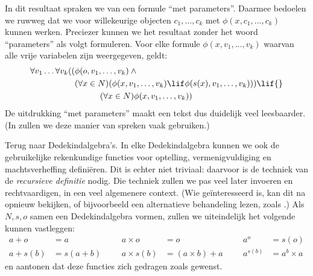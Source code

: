\documentclass[../../../include/open-logic-section]{subfiles}
\begin{document}
In dit resultaat spraken we van een formule ``met parameters''.
Daarmee bedoelen we ruwweg dat we voor willekeurige objecten $c_1,
\ldots, c_k$ met $\phi(x, c_1, \ldots, c_k)$ kunnen werken. Preciezer
kunnen we het resultaat zonder het woord ``parameters'' als volgt
formuleren. Voor elke formule $\phi(x, v_1, \ldots, v_k)$ waarvan alle
vrije variabelen zijn weergegeven, geldt:
	\begin{align*}
			\forall v_1 \ldots \forall v_k((&\phi(o, v_1,\ldots, v_k) \land {}\\
			&	(\forall x \in N)(\phi(x,v_1, \ldots, v_k) \lif \phi(s(x), v_1,\ldots, v_k))) \lif {}\\
			&\hspace{3em} (\forall x \in N)\phi(x, v_1,\ldots, v_k))
	\end{align*}
De uitdrukking ``met parameters'' maakt een tekst dus duidelijk veel
leesbaarder. (In  zullen we deze manier van spreken
vaak gebruiken.)

Terug naar Dedekindalgebra's. In elke Dedekindalgebra kunnen we ook de
gebruikelijke rekenkundige functies voor optelling, vermenigvuldiging
en machtsverheffing definiëren. Dit is echter niet triviaal: daarvoor
is de techniek van de \emph{recursieve definitie} nodig. Die techniek
zullen we pas veel later invoeren en rechtvaardigen, in een veel
algemenere context. (Wie geïnteresseerd is, kan dit na
 opnieuw bekijken, of bijvoorbeeld
een alternatieve behandeling lezen, zoals \citealt[pp.~95--8]{Potter2004}.)
Als $N, s, o$ samen een Dedekindalgebra vormen, zullen we uiteindelijk
het volgende kunnen vastleggen:
\begin{align*}
	{a} + {o} &= {a} & & & {a} \times {o} &= {o} & & & {a}^{o} &= s(o)\\
{a} + {s}({b}) &= {s}({a}+{b}) &&& {a} \times {s}({b}) &= ({a}\times {b}) + {a}  & & & {a}^{{s}({b})} &= {a}^{b} \times {a}
\end{align*}
en aantonen dat deze functies zich gedragen zoals gewenst.
\end{document}
